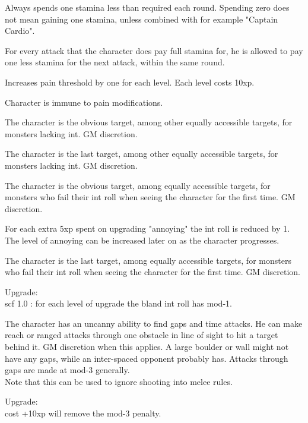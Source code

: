  Always spends one stamina less than required each round. Spending zero does not mean gaining one stamina, unless combined with for example "Captain Cardio".


 For every attack that the character does pay full stamina for, he is allowed to pay one less stamina for the next attack, within the same round.


 Increases pain threshold by one for each level. Each level costs 10xp.


 Character is immune to pain modifications.


 The character is the obvious target, among other equally accessible targets, for monsters lacking int. GM discretion.


 The character is the last target, among other equally accessible targets, for monsters lacking int. GM discretion.


 The character is the obvious target, among equally accessible targets, for monsters who fail their int roll when seeing the character for the first time. GM discretion.

For each extra 5xp spent on upgrading "annoying" the int roll is reduced by 1. The level of annoying can be increased later on as the character progresses.


  The character is the last target, among equally accessible targets, for monsters who fail their int roll when seeing the character for the first time. GM discretion.

Upgrade:\\
scf 1.0 : for each level of upgrade the bland int roll has mod-1.


 The character has an uncanny ability to find gaps and time attacks. He can make reach or ranged attacks through one obstacle in line of sight to hit a target behind it. GM discretion when this applies. A large boulder or wall might not have any gaps, while an inter-spaced opponent probably has. Attacks through gaps are made at mod-3 generally. \\
Note that this can be used to ignore shooting into melee rules.

Upgrade: \\
cost +10xp will remove the mod-3 penalty.


